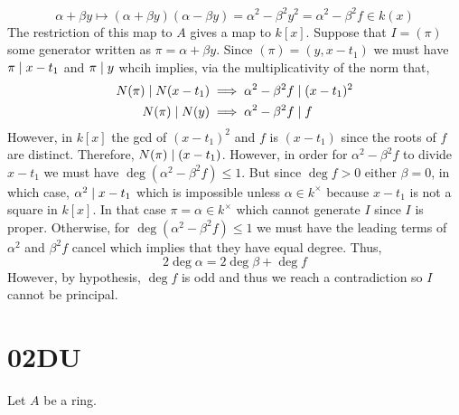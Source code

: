 \documentclass[12pt]{article}
\begin{document}
\[ \alpha + \beta y \mapsto  (\alpha + \beta y)(\alpha - \beta y) = \alpha^2 - \beta^2 y^2 = \alpha^2 - \beta^2 f \in k(x) \]
The restriction of this map to $A$ gives a map to $k[x]$.  Suppose that $I = (\pi)$ some generator written as $\pi = \alpha + \beta y$. Since $(\pi) = (y, x- t_1)$ we must have $\pi \mid x - t_1$ and $\pi \mid y$ whcih implies, via the multiplicativity of the norm that, 
\begin{align*}
N(\pi) \mid N(x - t_1) & \implies \alpha^2 - \beta^2 f \mid (x - t_1)^2 
\\
N(\pi) \mid N(y) & \implies \alpha^2 - \beta^2 f \mid f
\end{align*}
However, in $k[x]$ the gcd of $(x - t_1)^2$ and $f$ is $(x - t_1)$ since the roots of $f$ are distinct. Therefore, $N(\pi) \mid (x - t_1)$. However, in order for $\alpha^2 - \beta^2 f$ to divide $x - t_1$ we must have $\deg{(\alpha^2 - \beta^2 f)} \le 1$. But since $\deg{f} > 0$ either $\beta = 0$, in which case, $\alpha^2 \mid x - t_1$ which is impossible unless $\alpha \in k^\times$ because $x - t_1$ is not a square in $k[x]$. In that case $\pi = \alpha \in k^\times$ which cannot generate $I$ since $I$ is proper. Otherwise, for $\deg{(\alpha^2 - \beta^2 f)} \le 1$ we must have the leading terms of $\alpha^2$ and $\beta^2 f$ cancel which implies that they have equal degree. Thus,
\[ 2 \deg{\alpha} = 2 \deg{\beta} + \deg{f} \]
However, by hypothesis, $\deg{f}$ is odd and thus we reach a contradiction so $I$ cannot be principal.  

\section{02DU}

Let $A$ be a ring. 

\subsection{}
\end{document}

